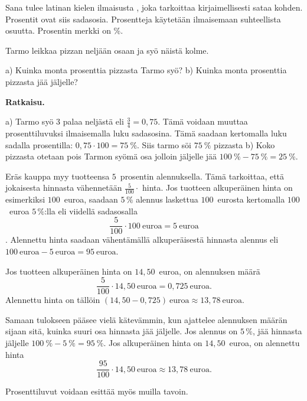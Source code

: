 Sana  tulee latinan kielen ilmaisusta ,
joka tarkoittaa kirjaimellisesti sataa kohden. 
Prosentit ovat siis sadasosia.
Prosentteja käytetään ilmaisemaan suhteellista osuutta.
Prosentin merkki on \%.


\begin{esimerkki}
Tarmo leikkaa pizzan neljään osaan ja syö näistä kolme.

a) Kuinka monta prosenttia pizzasta Tarmo syö?
\newline b) Kuinka monta prosenttia pizzasta jää jäljelle?

\textbf{Ratkaisu.}

a) Tarmo syö 3 palaa neljästä eli $\frac{3}{4} = 0,75$. Tämä voidaan muuttaa prosenttiluvuksi ilmaisemalla luku sadasosina. Tämä saadaan kertomalla luku sadalla prosentilla: $0,75 \cdot 100 = 75~\%$. Siis tarmo söi $75~\%$ pizzasta
\newline b) Koko pizzasta otetaan pois Tarmon syömä osa jolloin jäljelle jää $100~\% - 75~\% = 25~\%$.
\end{esimerkki}


\begin{esimerkki}
Eräs kauppa myy tuotteensa $5$~prosentin alennuksella. Tämä tarkoittaa, että jokaisesta hinnasta vähennetään $\frac{5}{100} \cdot$ hinta. Jos tuotteen alkuperäinen hinta on esimerkiksi $100$~euroa, saadaan $5\,\%$ alennus laskettua $100$~eurosta kertomalla $100$~euroa $5\,\%$:lla eli viidellä sadasosalla 
\[
\frac{5}{100} \cdot 100~\text{euroa} = 5~\text{euroa}
\].
Alennettu hinta saadaan vähentämällä alkuperäisestä hinnasta alennus eli $100~\text{euroa} - 5~\text{euroa} = 95~\text{euroa}$.

Jos tuotteen alkuperäinen hinta on $14,50$~euroa, on alennuksen määrä
\[
	\frac{5}{100} \cdot 14,50~\text{euroa} = 0,725~\text{euroa}.
\]
Alennettu hinta on tällöin $(14,50 - 0,725)~\text{euroa} \approx 13,78~\text{euroa}$.

Samaan tulokseen pääsee vielä kätevämmin, kun ajattelee alennuksen määrän sijaan sitä, kuinka suuri osa hinnasta jää jäljelle. Jos alennus on $5\,\%$, jää hinnasta jäljelle $100~\% - 5~\% = 95~\%$. Jos alkuperäinen hinta on $14,50$~euroa, on alennettu hinta 
\[
	\frac{95}{100} \cdot 14,50~\text{euroa} \approx 13,78~\text{euroa}.
\]
\end{esimerkki}

\begin{esimerkki}
    Prosenttiluvut voidaan esittää myös muilla tavoin.
    \begin{alakohdat}
    \end{alakohdat}
\end{esimerkki}

